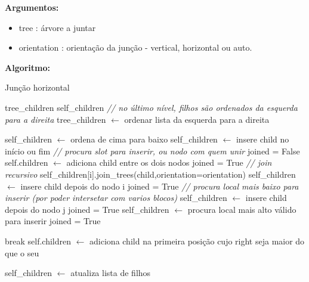 \textbf{Argumentos:}
\begin{itemize}\setlength\itemsep{-0.3em}
	\vspace{-0.5em}
	\item tree : árvore a juntar
	\item orientation : orientação da junção - vertical, horizontal ou auto.
\end{itemize}

\textbf{Algoritmo:}

\begin{breakablealgorithm}
	\caption{Junção horizontal}
	\footnotesize
	\begin{algorithmic}[1]
		\State tree\_children
		\State self\_children
		\State \textit{// no último nível, filhos são ordenados da esquerda para a direita}
			\State tree\_children $\leftarrow$ ordenar lista da esquerda para a direita
		\EndIf
		
				\State self\_children $\leftarrow$ ordena de cima para baixo
					\State self\_children $\leftarrow$ insere child no início ou fim
				\Else
					\State \textit{// procura slot para inserir, ou nodo com quem unir}
					\State joined = False
							\State self.children $\leftarrow$ adiciona child entre os dois nodos
							\State joined = True
									\State \textit{// join recursivo}
									\State self\_children[i].join\_trees(child,orientation=orientation)
								\Else
									\State self\_children $\leftarrow$ insere child depois do nodo i
								\EndIf
								\State joined = True
							\Else
								\State \textit{// procura local mais baixo para inserir (por poder intersetar com varios blocos)}
										\State self\_children $\leftarrow$ insere child depois do nodo j
										\State joined = True
									\EndIf
								\EndFor
									\State self\_children $\leftarrow$ procura local mais alto válido para inserir
									\State joined = True
								\EndIf
							\EndIf
						\EndIf
						
							\State break
						\EndIf
					\EndFor
				\EndIf
			\Else
				\State self.children $\leftarrow$ adiciona child na primeira posição cujo right seja maior do que o seu
			\EndIf
			
			\State self\_children $\leftarrow$ atualiza lista de filhos
		\EndFor
		
		
	\end{algorithmic}
\end{breakablealgorithm}

